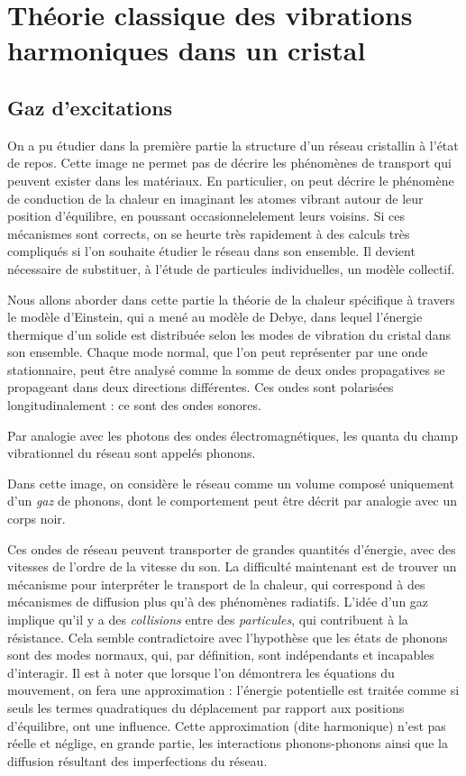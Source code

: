 \chapter{Théorie classique des vibrations harmoniques dans un cristal}

\section{Gaz d'excitations}

On a pu étudier dans la première partie la structure d'un réseau
cristallin à l'état de repos. Cette image ne permet pas de décrire les
phénomènes de transport qui peuvent exister dans les matériaux. En particulier,
on peut décrire le phénomène de conduction de la chaleur en imaginant les atomes
vibrant autour de leur position d'équilibre, en poussant occasionnelelement
leurs voisins.
Si ces mécanismes sont corrects, on se heurte très rapidement à des calculs très
compliqués si l'on souhaite étudier le réseau dans son ensemble. Il devient
nécessaire de substituer, à l'étude de particules individuelles, un modèle
collectif.

Nous allons aborder dans cette partie la théorie de la chaleur spécifique à
travers le modèle d'Einstein, qui a mené au modèle de Debye, dans lequel
l'énergie thermique d'un solide est distribuée selon les modes de vibration du 
cristal dans son ensemble. Chaque mode normal, que l'on peut représenter par une
onde stationnaire, peut être analysé comme la somme de deux ondes propagatives
se propageant dans deux directions différentes. Ces ondes sont polarisées
longitudinalement : ce sont des ondes sonores.

Par analogie avec les photons des ondes électromagnétiques, les quanta du
champ vibrationnel du réseau sont appelés phonons.

Dans cette image, on considère le réseau comme un volume composé uniquement d'un
\emph{gaz} de phonons, dont le comportement peut être décrit par analogie avec
un corps noir.

Ces ondes de réseau peuvent transporter de grandes quantités d'énergie, avec
des vitesses de l'ordre de la vitesse du son. La difficulté maintenant est de
trouver un mécanisme pour interpréter le transport de la chaleur, qui correspond
à des mécanismes de diffusion plus qu'à des phénomènes radiatifs. L'idée d'un
gaz implique qu'il y a des \emph{collisions} entre des \emph{particules}, qui
contribuent à la résistance. Cela semble contradictoire avec l'hypothèse que les
états de phonons sont des modes normaux, qui, par définition, sont
indépendants et incapables d'interagir. Il est à noter que lorsque l'on
démontrera les équations du mouvement, on fera une approximation :
l'énergie potentielle est traitée comme si seuls les termes quadratiques
du déplacement par rapport aux positions d'équilibre, ont une influence.
Cette approximation (dite harmonique) n'est pas réelle et néglige, en grande
partie, les interactions phonons-phonons ainsi que la diffusion résultant
des imperfections du réseau.


